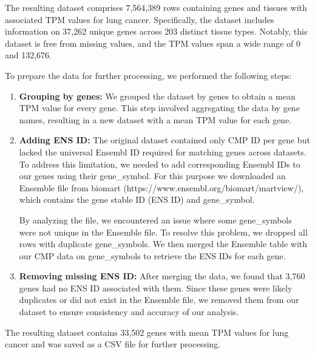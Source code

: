 The resulting dataset comprises 7,564,389 rows containing genes and tissues with associated TPM values for lung cancer.
Specifically, the dataset includes information on 37,262 unique genes across 203 distinct tissue types.
Notably, this dataset is free from missing values, and the TPM values span a wide range of 0 and 132,676.

To prepare the data for further processing, we performed the following steps:
\begin{enumerate}
    \item \textbf{Grouping by genes:} We grouped the dataset by genes to obtain a mean TPM value for every gene.
    This step involved aggregating the data by gene names, resulting in a new dataset with a mean TPM value for each gene.
    \item \textbf{Adding ENS ID:}
    The original dataset contained only CMP ID per gene but lacked the universal Ensembl ID required for matching genes across datasets.
    To address this limitation, we needed to add corresponding Ensembl IDs to our genes using their gene\_symbol.
    For this purpose we downloaded an Ensemble file from biomart (https://www.ensembl.org/biomart/martview/),
    which contains the gene stable ID (ENS ID) and gene\_symbol.

    By analyzing the file, we encountered an issue where some gene\_symbols were not unique in the Ensemble file.
    To resolve this problem, we dropped all rows with duplicate gene\_symbols. %
    We then merged the Ensemble table with our CMP data on gene\_symbols to retrieve the ENS IDs for each gene.

    \item \textbf{Removing missing ENS ID:} After merging the data, we found that 3,760 genes had no ENS ID associated with them.
    Since these genes were likely duplicates or did not exist in the Ensemble file,
    we removed them from our dataset to ensure consistency and accuracy of our analysis.
\end{enumerate}
The resulting dataset contains 33,502 genes with mean TPM values for lung cancer and was saved as a CSV file for further processing.

